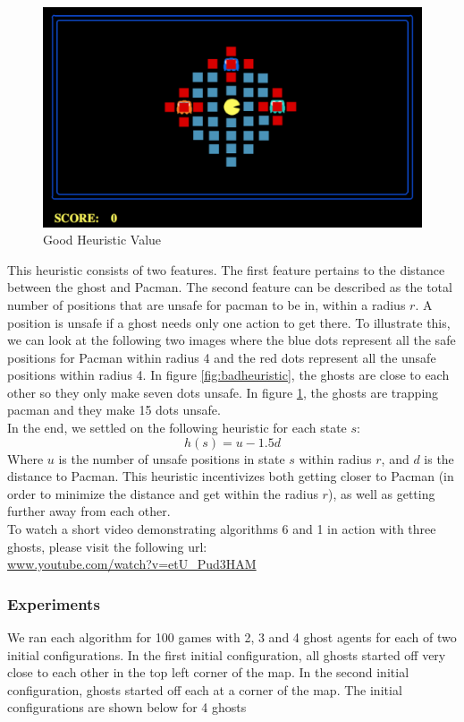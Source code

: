 \documentclass[11pt]{article}
\begin{document}
\begin{multicols}{2}
\begin{figure}[H]
	\includegraphics[width=\columnwidth]{goodheuristic.png}
	\caption{Good Heuristic Value}
	\label{fig:goodheuristic}
\end{figure}



This heuristic consists of two features. The first feature pertains to the distance between the ghost and Pacman. The second feature can be described as the total number of positions that are unsafe for pacman to be in, within a radius $r$. A position is unsafe if a ghost needs only one action to get there. To illustrate this, we can look at the following two images where the blue dots represent all the safe positions for Pacman within radius 4 and the red dots represent all the unsafe positions within radius 4. In figure \ref{fig:badheuristic}, the ghosts are close to each other so they only make seven dots unsafe. In figure \ref{fig:goodheuristic}, the ghosts are trapping pacman and they make 15 dots unsafe.\\ 

In the end, we settled on the following heuristic for each state $s$:
$$h(s) = u - 1.5d$$ Where $u$ is the number of unsafe positions in state $s$ within radius $r$, and $d$ is the distance to Pacman. This heuristic incentivizes both getting closer to Pacman (in order to minimize the distance and get within the radius $r$), as well as getting further away from each other.\\
To watch a short video demonstrating algorithms 6 and 1 in action with three ghosts, please visit the following url: \\
\url{www.youtube.com/watch?v=etU_Pud3HAM}



\subsubsection{Experiments}
We ran each algorithm for 100 games with 2, 3 and 4 ghost agents for each of two initial configurations. In the first initial configuration, all ghosts started off very close to each other in the top left corner of the map. In the second initial configuration, ghosts started off each at a corner of the map. The initial configurations are shown below for 4 ghosts


\end{multicols}
\end{document}
